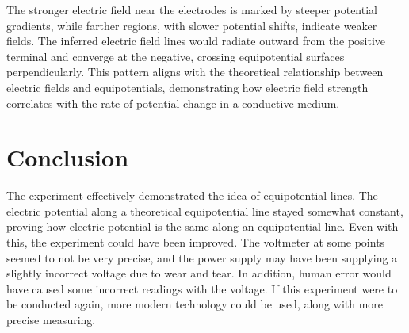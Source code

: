 \documentclass[conference]{IEEEtran}
\begin{document}
The stronger electric field near the electrodes is marked by steeper potential gradients, while farther regions, with slower potential shifts, indicate weaker fields. The inferred electric field lines would radiate outward from the positive terminal and converge at the negative, crossing equipotential surfaces perpendicularly. This pattern aligns with the theoretical relationship between electric fields and equipotentials, demonstrating how electric field strength correlates with the rate of potential change in a conductive medium.

\section{Conclusion}
The experiment effectively demonstrated the idea of equipotential lines. The electric potential along a theoretical equipotential line stayed somewhat constant, proving how electric potential is the same along an equipotential line. Even with this, the experiment could have been improved. The voltmeter at some points seemed to not be very precise, and the power supply may have been supplying a slightly incorrect voltage due to wear and tear. In addition, human error would have caused some incorrect readings with the voltage. If this experiment were to be conducted again, more modern technology could be used, along with more precise measuring.
\end{document}

